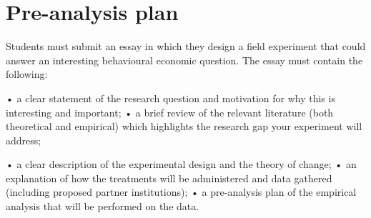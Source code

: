 \documentclass[11pt,preprint, authoryear]{elsarticle}
\numberwithin{equation}{section}
\numberwithin{figure}{section}
\numberwithin{table}{section}
\begin{document}
\hypertarget{pre-analysis-plan}{%
\section{\texorpdfstring{Pre-analysis plan
\label{pre}}{Pre-analysis plan }}\label{pre-analysis-plan}}

Students must submit an essay in which they design a field experiment
that could answer an interesting behavioural economic question. The
essay must contain the following:

• a clear statement of the research question and motivation for why this
is interesting and important; • a brief review of the relevant
literature (both theoretical and empirical) which highlights the
research gap your experiment will address;

• a clear description of the experimental design and the theory of
change; • an explanation of how the treatments will be administered and
data gathered (including proposed partner institutions); • a
pre-analysis plan of the empirical analysis that will be performed on
the data.
\end{document}
